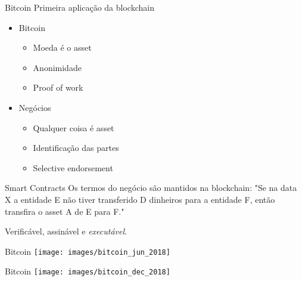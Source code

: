 \begin{frame}{Bitcoin}
Primeira aplicação da blockchain
\begin{itemize}
	\item Bitcoin
	\begin{itemize}
		\item Moeda é o asset
		\item Anonimidade
		\item Proof of work
	\end{itemize}
	\item Negócios	
	\begin{itemize}
		\item Qualquer coisa é asset
		\item Identificação das partes
		\item Selective endorsement
	\end{itemize}
\end{itemize}
\end{frame}

\begin{frame}{Smart Contracts}
	Os termos do negócio são mantidos na blockchain: "Se na data X a entidade E não tiver transferido D dinheiros para a entidade F, então transfira o asset A de E para F."
	
	Verificável, assinável e \emph{executável}.	
\end{frame}


\frame{}

\begin{frame}{Bitcoin}
\texttt{[image: images/bitcoin\_jun\_2018]}
\end{frame}

\begin{frame}{Bitcoin}
\texttt{[image: images/bitcoin\_dec\_2018]}
\end{frame}